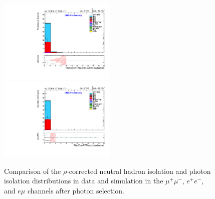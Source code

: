 \documentclass[oneside, a4paper, 11pt, ]{report}
\begin{document}
\begin{figure}
\includegraphics[width=0.5\textwidth]{Plots/ControlPlots/TTbarPhotonAnalysis/EMu/Photons/SignalPhotons/Photon_RhoCorrectedPFNeutralHadronIso_barrel_splitTTbar_ratio.pdf}
\includegraphics[width=0.5\textwidth]{Plots/ControlPlots/TTbarPhotonAnalysis/EMu/Photons/SignalPhotons/Photon_RhoCorrectedPFPhotonIso_barrel_splitTTbar_ratio.pdf}
\caption{Comparison of the $\rho$-corrected neutral hadron isolation and photon isolation distributions in data and simulation in the $\mu^{+}\mu^{-}$, $e^{+}e^{-}$, and $e\mu$ channels after photon selection.}
\label{fig-photonNeutralHadronAndPhotonIso}
\end{figure}
\end{document}
